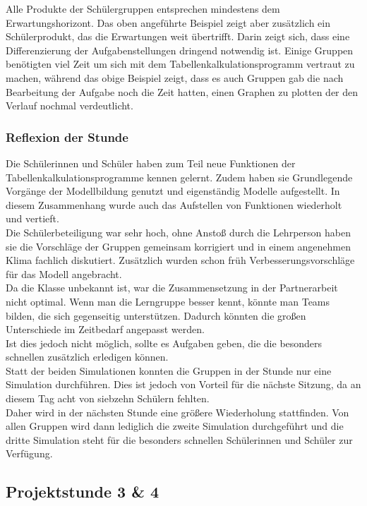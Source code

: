 Alle Produkte der Schülergruppen entsprechen mindestens dem Erwartungshorizont. Das oben angeführte Beispiel zeigt aber zusätzlich ein Schülerprodukt, das die Erwartungen weit übertrifft. Darin zeigt sich, dass eine Differenzierung der Aufgabenstellungen dringend notwendig ist. Einige Gruppen benötigten viel Zeit um sich mit dem Tabellenkalkulationsprogramm vertraut zu machen, während das obige Beispiel zeigt, dass es auch Gruppen gab die nach Bearbeitung der Aufgabe noch die Zeit hatten, einen Graphen zu plotten der den Verlauf nochmal verdeutlicht.  

\subsubsection{Reflexion der Stunde}
Die Schülerinnen und Schüler haben zum Teil neue Funktionen der Tabellenkalkulationsprogramme kennen gelernt. Zudem haben sie Grundlegende Vorgänge der Modellbildung genutzt und eigenständig Modelle aufgestellt. In diesem Zusammenhang wurde auch das Aufstellen von Funktionen wiederholt und vertieft.\\
Die Schülerbeteiligung war sehr hoch, ohne Anstoß durch die Lehrperson haben sie die Vorschläge der Gruppen gemeinsam korrigiert und in einem angenehmen Klima fachlich diskutiert. Zusätzlich wurden schon früh Verbesserungsvorschläge für das Modell angebracht.\\
Da die Klasse unbekannt ist, war die Zusammensetzung in der Partnerarbeit nicht optimal. Wenn man die Lerngruppe besser kennt, könnte man Teams bilden, die sich gegenseitig unterstützen. Dadurch könnten die großen Unterschiede im Zeitbedarf angepasst werden.\\
Ist dies jedoch nicht möglich, sollte es Aufgaben geben, die die besonders schnellen zusätzlich erledigen können.\\
Statt der beiden Simulationen konnten die Gruppen in der Stunde nur eine Simulation durchführen. Dies ist jedoch von Vorteil für die nächste Sitzung, da an diesem Tag acht von siebzehn Schülern fehlten.\\
Daher wird in der nächsten Stunde eine größere Wiederholung stattfinden. Von allen Gruppen wird dann lediglich die zweite Simulation durchgeführt und die dritte Simulation steht für die besonders schnellen Schülerinnen und Schüler zur Verfügung. 
\newpage
\subsection{Projektstunde 3 \& 4}\ellen

